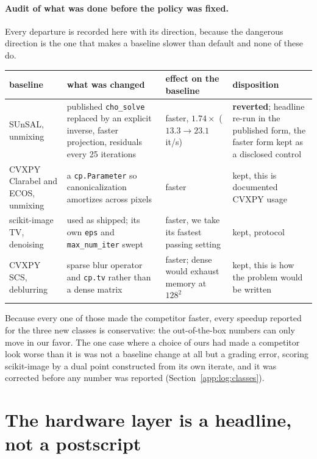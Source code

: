 \documentclass[11pt]{article}
\begin{document}
\paragraph{Audit of what was done before the policy was fixed.} Every
departure is recorded here with its direction, because the dangerous direction
is the one that makes a baseline slower than default and none of these do.

\begin{center}\small
\begin{tabular}{@{}p{3.3cm}p{5.2cm}p{2.3cm}p{4.0cm}@{}}
\toprule
baseline & what was changed & effect on the baseline & disposition \\
\midrule
SUnSAL, unmixing &
published \texttt{cho\_solve} replaced by an explicit inverse, faster
projection, residuals every 25 iterations &
faster, $1.74\times$ ($13.3 \to 23.1$ it/s) &
\textbf{reverted}; headline re-run in the published form, the faster form kept
as a disclosed control \\
\addlinespace
CVXPY Clarabel and ECOS, unmixing &
a \texttt{cp.Parameter} so canonicalization amortizes across pixels &
faster & kept, this is documented CVXPY usage \\
\addlinespace
scikit-image TV, denoising &
used as shipped; its own \texttt{eps} and \texttt{max\_num\_iter} swept &
faster, we take its fastest passing setting & kept, protocol \\
\addlinespace
CVXPY SCS, deblurring &
sparse blur operator and \texttt{cp.tv} rather than a dense matrix &
faster; dense would exhaust memory at $128^2$ & kept, this is how the problem
would be written \\
\bottomrule
\end{tabular}
\end{center}

Because every one of those made the competitor faster, every speedup reported
for the three new classes is conservative: the out-of-the-box numbers can only
move in our favor. The one case where a choice of ours had made a competitor
look worse than it is was not a baseline change at all but a grading error,
scoring scikit-image by a dual point constructed from its own iterate, and it
was corrected before any number was reported (Section~\ref{app:log:classes}).

\section{The hardware layer is a headline, not a postscript}
\label{app:log:hardware}
\end{document}
